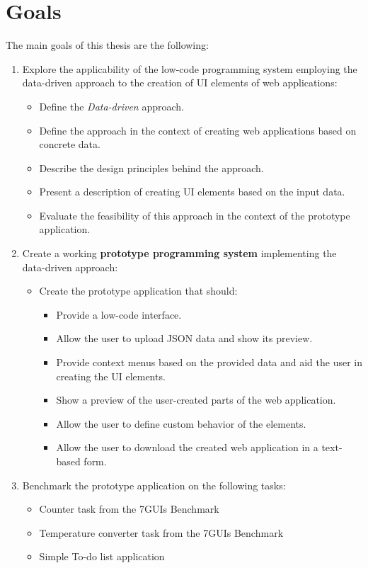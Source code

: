 \section*{Goals}
The main goals of this thesis are the following:
\begin{enumerate}
	\item Explore the applicability of the low-code programming system employing the data-driven approach to the creation of UI elements of web applications:
	      \begin{itemize}
		      \item Define the \emph{Data-driven} approach.
		      \item Define the approach in the context of creating web applications based on concrete data.
		      \item Describe the design principles behind the approach.
		      \item Present a description of creating UI elements based on the input data.
		      \item Evaluate the feasibility of this approach in the context of the prototype application.
	      \end{itemize}
	\item Create a working \textbf{prototype programming system} implementing the data-driven approach:
	      \begin{itemize}
		      \item Create the prototype application that should:
		            \begin{itemize}
			            \item Provide a low-code interface.
			            \item Allow the user to upload JSON data and show its preview.
			            \item Provide context menus based on the provided data and aid the user in creating the UI elements.
			            \item Show a preview of the user-created parts of the web application.
			            \item Allow the user to define custom behavior of the elements.
			            \item Allow the user to download the created web application in a text-based form.
		            \end{itemize}
	      \end{itemize}
	\item Benchmark the prototype application on the following tasks:
	      \begin{itemize}
		      \item Counter task from the 7GUIs Benchmark
		      \item Temperature converter task from the 7GUIs Benchmark
		      \item Simple To-do list application
	      \end{itemize}
\end{enumerate}

